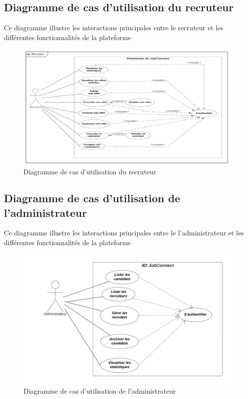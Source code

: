 \subsection{Diagramme de cas d’utilisation du recruteur}
Ce diagramme illustre les interactions principales entre le 
recruteur et les différentes fonctionnalités de la plateforme
\begin{figure}[h]
    \centering
    \includegraphics[scale=0.67]{Images/recruteur.jpg} %
    \caption{Diagramme de cas d’utilisation du recruteur}
    \label{fig:UCRecruteur}
\end{figure}
\vspace{12cm}

\subsection{Diagramme de cas d’utilisation de l'administrateur}
Ce diagramme illustre les interactions principales entre le 
l’administrateur et les différentes fonctionnalités de la plateforme
\begin{figure}[htbp]
    \centering
    \includegraphics[scale=0.2]{Images/admin uc.png} %
    \caption{Diagramme de cas d’utilisation de l'administrateur}
    \label{fig:UCAdmin}
\end{figure}
\vspace{1cm}


